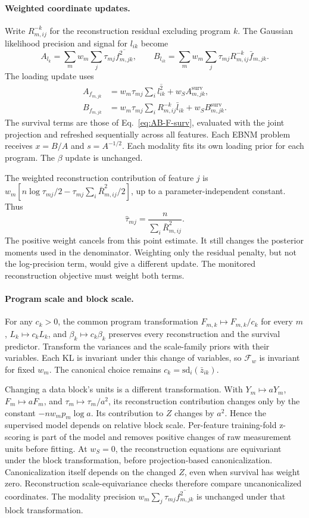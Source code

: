 \documentclass[11pt]{article}
\newcommand{\ws}{w_S}
\begin{document}
\paragraph{Weighted coordinate updates.} Write $R^{-k}_{m,ij}$ for the
reconstruction residual excluding program $k$. The Gaussian likelihood
precision and signal for $l_{ik}$ become
\[
 A_{l_k}=\sum_m w_m\sum_j\tau_{mj}\overline{f^2_{m,jk}},\qquad
 B_{l_{ik}}=\sum_m w_m\sum_j\tau_{mj}R^{-k}_{m,ij}\bar f_{m,jk}.
\]
The loading update uses
\begin{align*}
 A_{f_{m,jk}}&=w_m\tau_{mj}\sum_i\overline{l^2_{ik}}
                  +\ws A^{\mathrm{surv}}_{m,jk},\\
 B_{f_{m,jk}}&=w_m\tau_{mj}\sum_iR^{-k}_{m,ij}\bar l_{ik}
                  +\ws B^{\mathrm{surv}}_{m,jk}.
\end{align*}
The survival terms are those of Eq.~\eqref{eq:AB-F-surv}, evaluated with
the joint projection and refreshed sequentially across all features.
Each EBNM problem receives $x=B/A$ and $s=A^{-1/2}$. Each modality fits
its own loading prior for each program. The $\beta$ update is unchanged.

The weighted reconstruction contribution of feature $j$ is
$w_m[n\log\tau_{mj}/2-\tau_{mj}\sum_i\bar R^2_{m,ij}/2]$,
up to a parameter-independent constant. Thus
\[
 \widehat\tau_{mj}=\frac{n}{\sum_i\bar R^2_{m,ij}}.
\]
The positive weight cancels from this point estimate. It still changes
the posterior moments used in the denominator. Weighting only the
residual penalty, but not the log-precision term, would give a different
update. The monitored reconstruction objective must weight both terms.

\paragraph{Program scale and block scale.} For any $c_k>0$, the common
program transformation $F_{m,k}\mapsto F_{m,k}/c_k$ for every $m$,
$L_k\mapsto c_kL_k$, and $\beta_k\mapsto c_k\beta_k$ preserves every
reconstruction and the survival predictor. Transform the variances and
the scale-family priors with their variables. Each KL is invariant under
this change of variables, so $\mathcal F_w$ is invariant for fixed $w_m$.
The canonical choice remains $c_k=\mathrm{sd}_i(\bar z_{ik})$.

Changing a data block's units is a different transformation. With
$Y_m\mapsto aY_m$, $F_m\mapsto aF_m$, and
$\tau_m\mapsto\tau_m/a^2$, its reconstruction contribution changes only
by the constant $-nw_mp_m\log a$. Its contribution to $Z$ changes by
$a^2$. Hence the supervised model depends on relative block scale.
Per-feature training-fold z-scoring is part of the model and removes
positive changes of raw measurement units before fitting. At $\ws=0$,
the reconstruction equations are equivariant under the block transformation,
before projection-based canonicalization. Canonicalization itself depends
on the changed $Z$, even when survival has weight zero. Reconstruction
scale-equivariance checks therefore compare uncanonicalized coordinates.
The modality precision $w_m\sum_j\tau_{mj}\overline{f^2_{m,jk}}$
is unchanged under that block transformation.
\end{document}
